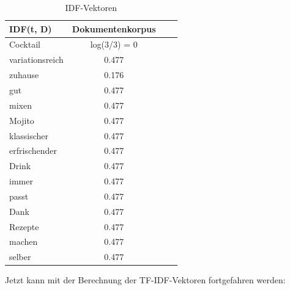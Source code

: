 \begin{table}[H]
    \centering
    \begin{tabular}{l|c|c|c}
        IDF(t, D)          & Dokumentenkorpus \\
        \hline
        Cocktail            & log(3/3) = 0  \\
        \hline
        variationsreich & 0.477   \\
        \hline
        zuhause                & 0.176  \\
        \hline
        gut                  & 0.477  \\
        \hline
        mixen            & 0.477  \\
        \hline
        Mojito & 0.477  \\
        \hline
        klassischer                & 0.477  \\
        \hline
        erfrischender                  & 0.477  \\
        \hline
        Drink            & 0.477  \\
        \hline
        immer & 0.477  \\
        \hline
        passt                & 0.477  \\
        \hline
        Dank                  & 0.477 \\
        \hline
        Rezepte            & 0.477 \\
        \hline
        machen & 0.477  \\
        \hline
        selber                & 0.477  \\
    \end{tabular}
    \caption{\label{table:IDF_Vektoren}\ac{IDF}-Vektoren}
\end{table}
\noindent
Jetzt kann mit der Berechnung der \ac{TF-IDF}-Vektoren fortgefahren werden:
